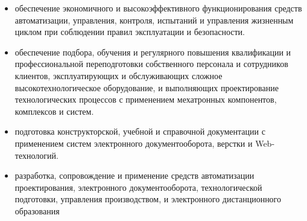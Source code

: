 \begin{enumerate}
\begin{itemize}[nosep]
    \item обеспечение экономичного и высокоэффективного функционирования средств
    автоматизации, управления, контроля, испытаний и управления жизненным циклом
    при соблюдении правил эксплуатации и безопасности.
    
    \item обеспечение подбора, обучения и регулярного повышения квалификации и
    профессиональной переподготовки собственного персонала и сотрудников
    клиентов, эксплуатирующих и обслуживающих сложное высокотехнологическое
    оборудование, и выполняющих проектирование технологических процессов с
    применением мехатронных компонентов, комплексов и систем.
    
    \item подготовка конструкторской, учебной и справочной документации с
    применением систем электронного документооборота, верстки и Web-технологий.
    
    \item разработка, сопровождение и применение средств автоматизации
    проектирования, электронного документооборота, технологической подготовки,
    управления производством, и электронного дистанционного образования
     
  \end{itemize}
\end{enumerate}